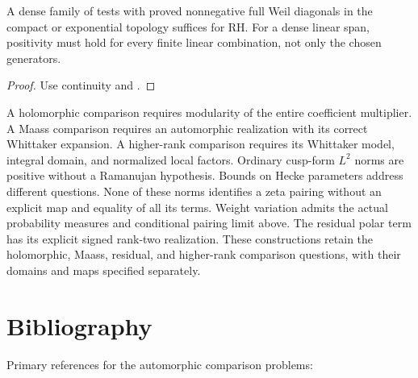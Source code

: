 \begin{corollary}
\label{v4-arith:w6-b:cor:sufficient-path}
A dense family of tests with proved nonnegative full Weil diagonals
in the compact or exponential topology suffices for RH.
For a dense linear span, positivity must hold for every finite
linear combination, not only the chosen generators.
\end{corollary}
\begin{proof}
Use continuity and .
\end{proof}

\begin{remark}
\label{v4-arith:w6-b:rem:gain-and-not}
A holomorphic comparison requires modularity of the entire
coefficient multiplier. A Maass comparison requires an automorphic
realization with its correct Whittaker expansion. A higher-rank
comparison requires its Whittaker model, integral domain, and
normalized local factors. Ordinary cusp-form $L^2$ norms are positive
without a Ramanujan hypothesis. Bounds on Hecke parameters address
different questions. None of these norms identifies a zeta pairing
without an explicit map and equality of all its terms.
Weight variation admits the actual probability measures and
conditional pairing limit above. The residual polar term has its
explicit signed rank-two realization. These constructions retain
the holomorphic, Maass, residual, and higher-rank comparison questions,
with their domains and maps specified separately.
\end{remark}
\section{Bibliography}
\label{v4-arith:w6-b:bibliography}

Primary references for the automorphic comparison problems:


